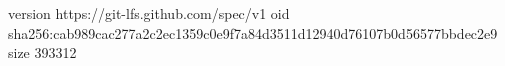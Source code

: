 version https://git-lfs.github.com/spec/v1
oid sha256:cab989cac277a2c2ec1359c0e9f7a84d3511d12940d76107b0d56577bbdec2e9
size 393312
